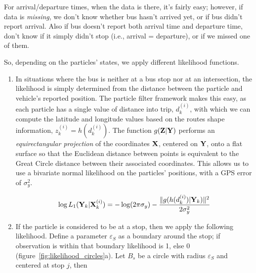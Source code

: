 \documentclass[draftcls,a4paper,onecolumn]{IEEEtran}\usepackage[]{graphicx}\usepackage[]{color}
\begin{document}
For arrival/departure times, when the data is there, it's fairly easy;
however, if data is \emph{missing}, we don't know whether bus hasn't arrived yet,
or if bus didn't report arrival.
Also if bus doesn't report both arrival time and departure time,
don't know if it simply didn't stop (i.e., arrival = departure),
or if we missed one of them.

So, depending on the particles' states, we apply different likelihood functions.

\begin{enumerate}
\item
In situations where the bus is neither at a bus stop nor at an intersection,
the likelihood is simply determined from the distance between the particle and 
vehicle's reported position.
The particle filter framework makes this easy,
as each particle has a single value of distance into trip, $d_k^{(i)}$,
with which we can compute the latitude and longitude values based on 
the routes shape information, $z_k^{(i)} = h(d_k^{(i)})$.
The function $g (\mathbf{Z} | \mathbf{Y})$ performs an \emph{equirectangular projection} \cite{Snyder1997}
of the coordinates $\mathbf{X}$, centered on $\mathbf{Y}$, 
onto a flat surface so that the Euclidean distance between points is equivalent
to the Great Circle distance between their associated coordinates.
This allows us to use a bivariate normal likelihood on the particles' positions,
with a GPS error of $\sigma_y^2$.

\begin{equation}
  \label{eq:l1}
  \log L_1 (\mathbf{Y}_k | \mathbf{X}_k^{(i)}) = - \log(2\pi\sigma_y) - \frac{\|g(h(d_k^{(i)})|\mathbf{Y}_k)\|^2}{2\sigma_y^2}
\end{equation}


\item
If the particle is considered to be at a stop, then we apply the following likelihood.
Define a parameter $\varepsilon_S$ as a boundary around the stop;
if observation is within that boundary likelihood is 1, else 0 (figure~\ref{fig:likelihood_circles}a).
Let $B_s$ be a circle with radius $\varepsilon_S$ and centered at stop $j$, then


\end{enumerate}
\end{document}

